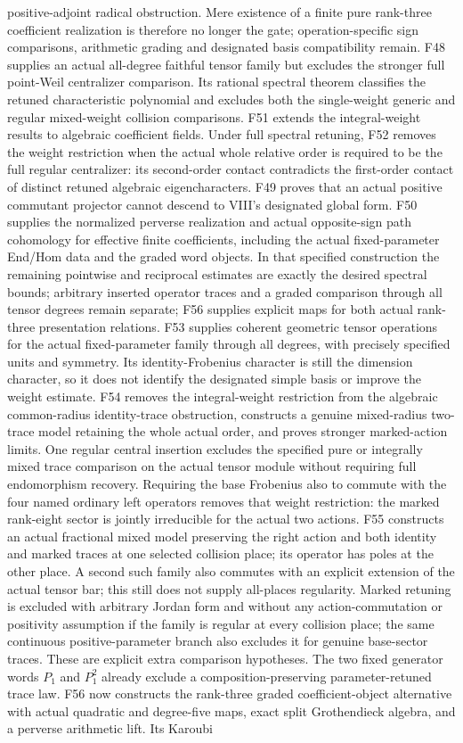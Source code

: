 \documentclass[11pt,a4paper]{article}
\theoremstyle{named}\newtheorem{finding}{Finding}[section]
\theoremstyle{definition}\newtheorem{definition}[finding]{Definition}
\theoremstyle{remark}\newtheorem{remark}[finding]{Remark}
\begin{document}
positive-adjoint radical obstruction. Mere existence of a finite
pure rank-three coefficient realization is therefore no longer
the gate; operation-specific sign comparisons, arithmetic grading and
designated basis compatibility remain. F48 supplies an actual all-degree faithful tensor family but excludes the stronger full point-Weil centralizer comparison. Its rational spectral theorem classifies the retuned characteristic polynomial and excludes both the single-weight generic and regular mixed-weight collision comparisons. F51 extends the integral-weight results to algebraic coefficient fields. Under full spectral retuning, F52 removes the weight restriction when the actual whole relative order is required to be the full regular centralizer: its second-order contact contradicts the first-order contact of distinct retuned algebraic eigencharacters. F49 proves that an actual positive commutant projector cannot descend to VIII's designated global form. F50 supplies the normalized perverse realization and actual opposite-sign path cohomology for effective finite coefficients, including the actual fixed-parameter End/Hom data and the graded word objects. In that specified construction the remaining pointwise and reciprocal estimates are exactly the desired spectral bounds; arbitrary inserted operator traces and a graded comparison through all tensor degrees remain separate; F56 supplies explicit maps for both actual rank-three presentation relations. F53 supplies coherent geometric tensor operations for the actual fixed-parameter family through all degrees, with precisely specified units and symmetry. Its identity-Frobenius character is still the dimension character, so it does not identify the designated simple basis or improve the weight estimate. F54 removes the integral-weight restriction from the algebraic common-radius identity-trace obstruction, constructs a genuine mixed-radius two-trace model retaining the whole actual order, and proves stronger marked-action limits. One regular central insertion excludes the specified pure or integrally mixed trace comparison on the actual tensor module without requiring full endomorphism recovery. Requiring the base Frobenius also to commute with the four named ordinary left operators removes that weight restriction: the marked rank-eight sector is jointly irreducible for the actual two actions. F55 constructs an actual fractional mixed model preserving the right action and both identity and marked traces at one selected collision place; its operator has poles at the other place. A second such family also commutes with an explicit extension of the actual tensor bar; this still does not supply all-places regularity. Marked retuning is excluded with arbitrary Jordan form and without any action-commutation or positivity assumption if the family is regular at every collision place; the same continuous positive-parameter branch also excludes it for genuine base-sector traces. These are explicit extra comparison hypotheses. The two fixed generator words $P_1$ and $P_1^2$ already exclude a composition-preserving parameter-retuned trace law. F56 now constructs the rank-three graded coefficient-object alternative with actual quadratic and degree-five maps, exact split Grothendieck algebra, and a perverse arithmetic lift. Its Karoubi 
\end{document}
